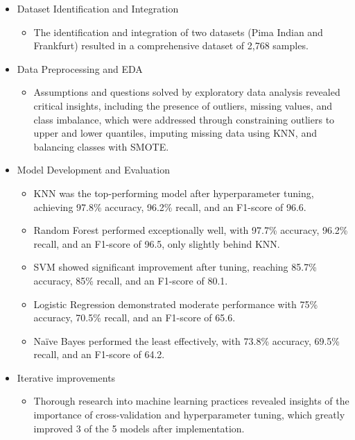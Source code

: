 \documentclass[12pt]{report}
\begin{document}
\begin{itemize}
    \item Dataset Identification and Integration
    \begin{itemize}
        \item The identification and integration of two datasets (Pima Indian and Frankfurt) resulted in a comprehensive dataset of 2,768 samples. 
    \end{itemize}
    \item Data Preprocessing and EDA
    \begin{itemize}
        \item Assumptions and questions solved by exploratory data analysis revealed critical insights, including the presence of outliers, missing values,
        and class imbalance, which were addressed through constraining outliers to upper and lower quantiles, imputing missing data using KNN, and balancing
        classes with SMOTE.
    \end{itemize}
    \item Model Development and Evaluation
    \begin{itemize}
        \item KNN was the top-performing model after hyperparameter tuning, achieving 97.8\% accuracy, 96.2\% recall, and an F1-score of 96.6.
        \item Random Forest performed exceptionally well, with 97.7\% accuracy, 96.2\% recall, and an F1-score of 96.5, only slightly behind KNN.
        \item SVM showed significant improvement after tuning, reaching 85.7\% accuracy, 85\% recall, and an F1-score of 80.1.
        \item Logistic Regression demonstrated moderate performance with 75\% accuracy, 70.5\% recall, and an F1-score of 65.6.
        \item Na\"ive Bayes performed the least effectively, with 73.8\% accuracy, 69.5\% recall, and an F1-score of 64.2.
    \end{itemize}
    \item Iterative improvements
    \begin{itemize}
        \item Thorough research into machine learning practices revealed insights of the importance of cross-validation and hyperparameter tuning,
        which greatly improved 3 of the 5 models after implementation.
    \end{itemize}
\end{itemize}
\end{document}
